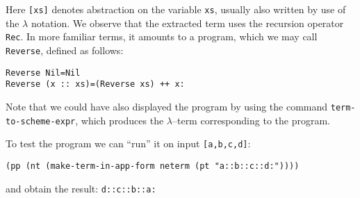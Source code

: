 \documentclass[12pt]{amsart}
\newcommand{\inquotes}[1]{``#1''}
\begin{document}
Here \texttt{[xs]} denotes abstraction on the variable \texttt{xs},
usually also written by use of the $\lambda$ notation.  We observe
that the extracted term uses the recursion operator \texttt{Rec}.  In
more familiar terms, it amounts to a program, which we may call
\texttt{Reverse}, defined as follows:
\begin{verbatim}
Reverse Nil=Nil
Reverse (x :: xs)=(Reverse xs) ++ x:
\end{verbatim}





Note that we could have also displayed the program by using the
command \texttt{term-to-scheme-expr}, which produces the
$\lambda$--term corresponding to the program.

To test the program we can \inquotes{run} it on input \texttt{[a,b,c,d]}:
\begin{verbatim}
(pp (nt (make-term-in-app-form neterm (pt "a::b::c::d:"))))
\end{verbatim}
and obtain the result: \texttt{d::c::b::a:}
\end{document}
